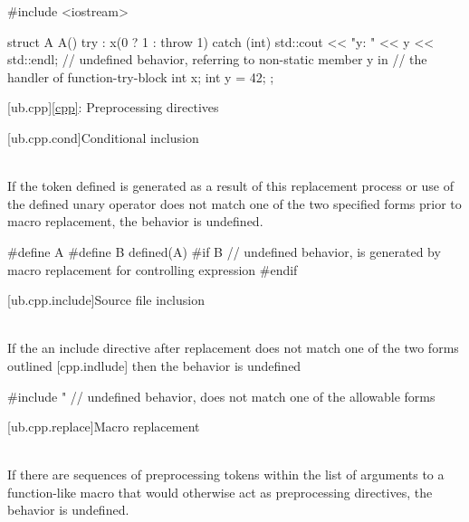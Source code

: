 \pnum
\begin{example}
\begin{codeblock}
#include <iostream>

struct A {
  A() try : x(0 ? 1 : throw 1) {
  } catch (int) {
    std::cout << "y: " << y << std::endl;   // undefined behavior, referring to non-static member y in
                                            // the handler of function-try-block
  }
  int x;
  int y = 42;
};
\end{codeblock}
\end{example}


[ub.cpp]{\ref{cpp}: Preprocessing directives}

[ub.cpp.cond]{Conditional inclusion}

\pnum
{} \\
If the token defined is generated as a result of this replacement process or use of
the defined unary operator does not match one of the two specified forms prior to macro replacement, the
behavior is undefined.

\pnum
\begin{example}
\begin{codeblock}
#define A
#define B defined(A)
#if B                   // undefined behavior,  is generated by macro replacement for controlling expression
#endif
\end{codeblock}
\end{example}


[ub.cpp.include]{Source file inclusion}

\pnum
{} \\
If the an include directive after replacement does not match one of the two forms
outlined [cpp.indlude] then the behavior is undefined

\pnum
\begin{example}
\begin{codeblock}
#include "              // undefined behavior, does not match one of the allowable forms
\end{codeblock}
\end{example}


[ub.cpp.replace]{Macro replacement}

\pnum
{} \\
If there are sequences of preprocessing tokens within the list of arguments to a function-like macro
that would otherwise act as preprocessing directives, the behavior is undefined.

